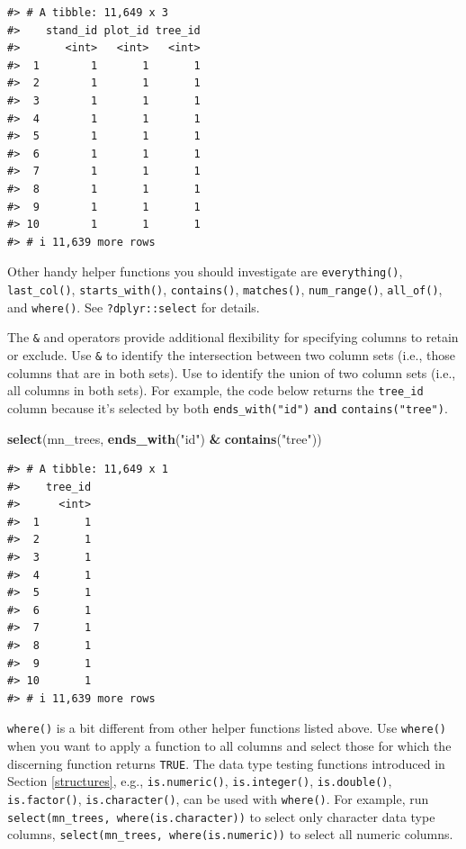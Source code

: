 \documentclass[
  11pt,
]{krantz}
\newenvironment{Shaded}{\begin{snugshade}}{\end{snugshade}}
\newcommand{\KeywordTok}[1]{\textcolor[rgb]{0.13,0.29,0.53}{\textbf{#1}}}
\newcommand{\NormalTok}[1]{#1}
\newcommand{\OperatorTok}[1]{\textcolor[rgb]{0.81,0.36,0.00}{\textbf{#1}}}
\newcommand{\StringTok}[1]{\textcolor[rgb]{0.31,0.60,0.02}{#1}}
\theoremstyle{definition}
\theoremstyle{definition}
\theoremstyle{definition}
\theoremstyle{definition}
\theoremstyle{remark}
\begin{document}
\begin{verbatim}
#> # A tibble: 11,649 x 3
#>    stand_id plot_id tree_id
#>       <int>   <int>   <int>
#>  1        1       1       1
#>  2        1       1       1
#>  3        1       1       1
#>  4        1       1       1
#>  5        1       1       1
#>  6        1       1       1
#>  7        1       1       1
#>  8        1       1       1
#>  9        1       1       1
#> 10        1       1       1
#> # i 11,639 more rows
\end{verbatim}

Other handy helper functions you should investigate are \texttt{everything()}, \texttt{last\_col()}, \texttt{starts\_with()}, \texttt{contains()}, \texttt{matches()}, \texttt{num\_range()}, \texttt{all\_of()}, and \texttt{where()}. See \texttt{?dplyr::select} for details.

The \texttt{\&} and \texttt{\textbar{}} operators provide additional flexibility for specifying columns to retain or exclude. Use \texttt{\&} to identify the intersection between two column sets (i.e., those columns that are in both sets). Use \texttt{\textbar{}} to identify the union of two column sets (i.e., all columns in both sets). For example, the code below returns the \texttt{tree\_id} column because it's selected by both \texttt{ends\_with("id")} \textbf{and} \texttt{contains("tree")}.

\begin{Shaded}
\begin{Highlighting}[]
\KeywordTok{select}\NormalTok{(mn\_trees, }\KeywordTok{ends\_with}\NormalTok{(}\StringTok{"id"}\NormalTok{) }\OperatorTok{\&}\StringTok{ }\KeywordTok{contains}\NormalTok{(}\StringTok{"tree"}\NormalTok{))}
\end{Highlighting}
\end{Shaded}

\begin{verbatim}
#> # A tibble: 11,649 x 1
#>    tree_id
#>      <int>
#>  1       1
#>  2       1
#>  3       1
#>  4       1
#>  5       1
#>  6       1
#>  7       1
#>  8       1
#>  9       1
#> 10       1
#> # i 11,639 more rows
\end{verbatim}

\texttt{where()} is a bit different from other helper functions listed above. Use \texttt{where()} when you want to apply a function to all columns and select those for which the discerning function returns \texttt{TRUE}. The data type testing functions introduced in Section \ref{structures}, e.g., \texttt{is.numeric()}, \texttt{is.integer()}, \texttt{is.double()}, \texttt{is.factor()}, \texttt{is.character()}, can be used with \texttt{where()}. For example, run \texttt{select(mn\_trees,\ where(is.character))} to select only character data type columns, \texttt{select(mn\_trees,\ where(is.numeric))} to select all numeric columns.
\end{document}
